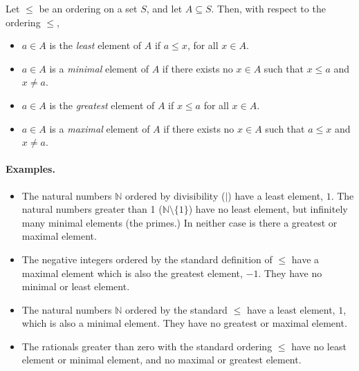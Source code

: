 \documentclass[12pt]{article}
\begin{document}
Let $\le$ be an ordering on a set $S$, and let $A \subseteq S$. Then, with respect  to the ordering $\le$, 

\begin{itemize}

\item $a \in A$ is the \emph{least} element of $A$ if $a \le x$, for all $x \in A$.
\item $a \in A$ is a \emph{minimal} element of $A$ if there exists no $x \in A$ such that $x \le a$ and $x \ne a$.
\item $a \in A$ is the \emph{greatest} element of $A$ if $x \le a$ for all $x \in A$.
\item $a \in A$ is a \emph{maximal} element of $A$ if there exists no $x \in A$ such that $a \le x$ and $x \ne a$.

\end{itemize}

\paragraph{Examples.}

\begin{itemize}
\item The natural numbers $\mathbb{N}$ ordered by divisibility ($\mid$) have a least element, $1$.  The natural numbers greater than 1 ($\mathbb{N} \setminus \{1\}$) have no least element, but infinitely many minimal elements (the primes.)  In neither case is there a greatest or maximal element.
\item  The negative integers ordered by the standard definition of $\le$ have a  maximal element which is also the greatest element, $-1$.  They have no minimal or least element.
\item The natural numbers $\mathbb{N}$ ordered by the standard $\le$ have a least element, $1$, which is also a minimal element.  They have no greatest or maximal element.  
\item The rationals greater than zero with the standard ordering $\le$ have no least element or minimal element, and no maximal or greatest element.
\end{itemize}
\end{document}
